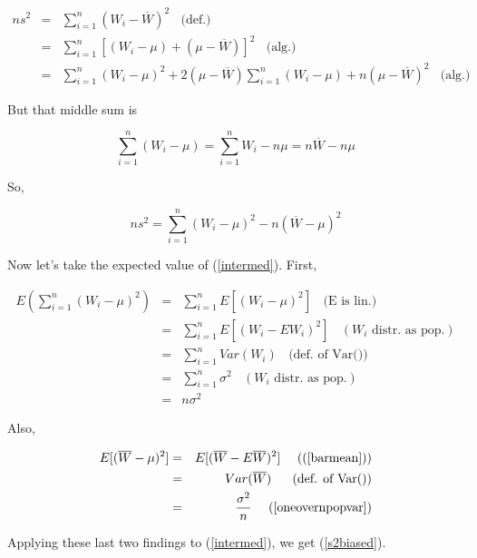 \begin{eqnarray}
ns^2 &=& \sum_{i=1}^n (W_i - \overline{W})^2 ~~~~ \textrm{(def.)} \\
&=& \sum_{i=1}^n 
\left [
(W_i - \mu) + (\mu - \overline{W})
\right ]^2 ~~~~ \textrm{(alg.)} \\
&=& 
\sum_{i=1}^n (W_i - \mu)^2 +
2 (\mu - \overline{W}) \sum_{i=1}^n (W_i - \mu) +
n (\mu - \overline{W})^2 ~~~~ \textrm{(alg.)}
\end{eqnarray}

But that middle sum is 

\begin{equation}
\sum_{i=1}^n (W_i - \mu) =
\sum_{i=1}^n W_i - n \mu =
n \overline{W} - n \mu
\end{equation}

So,

\begin{equation}
\label{intermed}
ns^2 = \sum_{i=1}^n (W_i - \mu)^2  - n (\overline{W} - \mu)^2 
\end{equation}

Now let's take the expected value of (\ref{intermed}).  First,

\begin{eqnarray}
E \left (
\sum_{i=1}^n (W_i - \mu)^2
\right )
&=& \sum_{i=1}^n E[(W_i - \mu)^2] ~~~~ \textrm{(E is lin.)} \\ 
&=& \sum_{i=1}^n E[(W_i - EW_i)^2] ~~~~ (W_i \textrm{ distr. as pop.}) \\ 
&=& \sum_{i=1}^n Var(W_i) ~~~~ \textrm{(def. of Var())} \\ 
&=& \sum_{i=1}^n \sigma^2 ~~~~ (W_i \textrm{ distr. as pop.}) \\ 
&=& n \sigma^2
\end{eqnarray}

Also,

\begin{eqnarray}
E[(\overline{W} - \mu)^2] &=& 
   E[(\overline{W} - E\overline{W})^2] ~~~~ ((\ref{barmean})) \\ 
&=& Var(\overline{W}) ~~~~ \textrm{ (def. of Var())} \\
&=& \frac{\sigma^2}{n} ~~~~ (\ref{oneovernpopvar})
\end{eqnarray}

Applying these last two findings to (\ref{intermed}), we get
(\ref{s2biased}).

